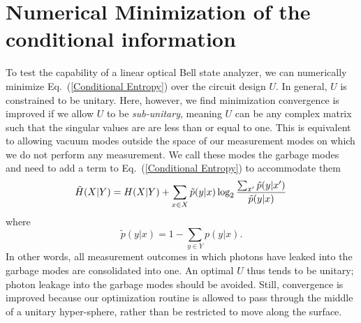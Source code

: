 \documentclass[aps,pra,twocolumn,showpacs,superscriptaddress,floatfix,10pt]{revtex4}
\begin{document}
\section{Numerical Minimization of the conditional information}
\label{Section on Numerical Minimization}
To test the capability of a linear optical Bell state analyzer, we can numerically minimize Eq.~(\ref{Conditional Entropy}) over the circuit design $U$. In general, $U$ is constrained to be unitary. Here, however, we find minimization convergence is improved if we allow $U$ to be \textit{sub-unitary}, meaning $U$ can be any complex matrix such that the singular values are are less than or equal to one. This is equivalent to allowing vacuum modes outside the space of our measurement modes on which we do not perform any measurement. We call these modes the garbage modes and need to add a term to Eq.~(\ref{Conditional Entropy}) to accommodate them
\begin{equation}
\label{Condition Information with Garbage modes}
\small	\tilde{H}(X|Y) = H(X|Y) + \sum_{x \in X} \tilde{p}(y|x) \log_2 \frac{\sum_{x^\prime} \tilde{p}(y|x^\prime)}{\tilde{p}(y|x)}\,
\end{equation}
where
\begin{equation}
	\tilde{p}(y|x) = 1 - \sum_{y \in Y} p(y|x).
\end{equation}
In other words, all measurement outcomes in which photons have leaked into the garbage modes are consolidated into one. An optimal $U$ thus tends to be unitary; photon leakage into the garbage modes should be avoided. Still, convergence is improved because our optimization routine is allowed to pass through the middle of a unitary hyper-sphere, rather than be restricted to move along the surface.
\end{document}
